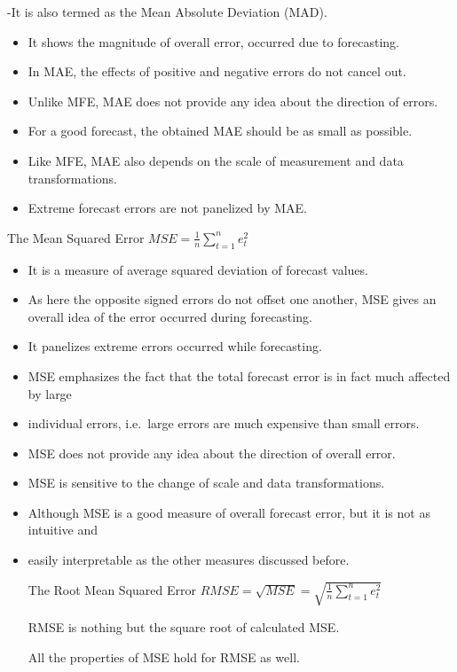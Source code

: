 \documentclass[12pt,a4paper]{book}
\begin{document}
{-It is also termed as the Mean Absolute Deviation (MAD).

\begin{itemize}
\item
  It shows the magnitude of overall error, occurred due to forecasting.
\item
  In MAE, the effects of positive and negative errors do not cancel out.
\item
  Unlike MFE, MAE does not provide any idea about the direction of
  errors.
\item
  For a good forecast, the obtained MAE should be as small as possible.
\item
  Like MFE, MAE also depends on the scale of measurement and data
  transformations.
\item
  Extreme forecast errors are not panelized by MAE.
\end{itemize}

The Mean Squared Error
\(\displaystyle MSE = \frac{1}{n}\sum_{t=1}^{n}e^{2}_{t}\)

\begin{itemize}
\item
  It is a measure of average squared deviation of forecast values.
\item
  As here the opposite signed errors do not offset one another, MSE
  gives an overall idea of the error occurred during forecasting.
\item
  It panelizes extreme errors occurred while forecasting.
\item
  MSE emphasizes the fact that the total forecast error is in fact much
  affected by large
\item
  individual errors, i.e.~large errors are much expensive than small
  errors.
\item
  MSE does not provide any idea about the direction of overall error.
\item
  MSE is sensitive to the change of scale and data transformations.
\item
  Although MSE is a good measure of overall forecast error, but it is
  not as intuitive and
\item
  easily interpretable as the other measures discussed before.

  The Root Mean Squared Error
  \(\displaystyle RMSE = \sqrt{MSE} = \sqrt {\frac{1}{n}\sum_{t=1}^{n}e^{2}_{t}}\)

  RMSE is nothing but the square root of calculated MSE.

  All the properties of MSE hold for RMSE as well.
\end{itemize}

}
\end{document}
